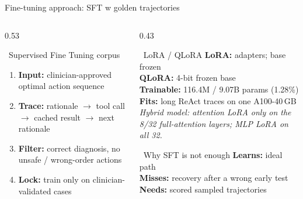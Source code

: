 \documentclass[aspectratio=169,t]{beamer}
\begin{document}
\begin{frame}{Fine-tuning approach: SFT w golden trajectories}
  \vspace{-1mm}
  \begin{columns}[T,onlytextwidth]
    \begin{column}{0.53\textwidth}
      \begin{block}{\faRoute\;\, Supervised Fine Tuning corpus}
        \footnotesize
        \begin{enumerate}\setlength\itemsep{0.10em}
          \item \textbf{Input:} clinician-approved optimal action sequence
          \item \textbf{Trace:} rationale $\rightarrow$ tool call $\rightarrow$
                cached result $\rightarrow$ next rationale
          \item \textbf{Filter:} correct diagnosis, no unsafe / wrong-order actions
          \item \textbf{Lock:} train only on clinician-validated cases
        \end{enumerate}
      \end{block}
    \end{column}%
    \hfill
    \begin{column}{0.43\textwidth}
      \begin{exampleblock}{\faMicrochip\;\, LoRA / QLoRA}
        \scriptsize
        \textbf{LoRA:} adapters; base frozen\\[-0.1mm]
        \textbf{QLoRA:} 4-bit frozen base\\[-0.1mm]
        \textbf{Trainable:} 116.4M / 9.07B params (1.28\%)\\[-0.1mm]
        \textbf{Fits:} long ReAct traces on one A100-40\,GB\\[0.4mm]
        {\tiny\itshape Hybrid model: attention LoRA only on the 8/32
        full-attention layers; MLP LoRA on all 32.}
      \end{exampleblock}
      \begin{alertblock}{\faBalanceScale\;\, Why SFT is not enough}
        \scriptsize
        \textbf{Learns:} ideal path\\[-0.1mm]
        \textbf{Misses:} recovery after a wrong early test\\[-0.1mm]
        \textbf{Needs:} scored sampled trajectories
      \end{alertblock}
    \end{column}
  \end{columns}
\end{frame}
\end{document}
